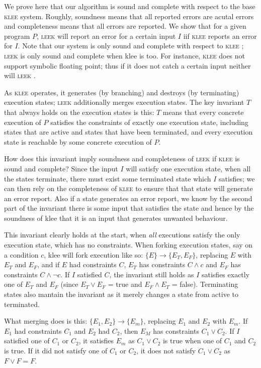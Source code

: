 \documentclass[12pt,a4paper]{article}
\newcommand{\klee}{\textsc{klee }}
\newcommand{\leek}{\textsc{leek }}
\begin{document}
We prove here that our algorithm is sound and complete with respect to the base \klee system. Roughly, soundness means that all reported errors are acutal errors and completeness means that all errors are reported. We show that for a given program $P$, \leek will report an error for a certain input $I$ iif \klee reports an error for $I$. Note that our system is only sound and complete with respect to \klee; \leek is only sound and complete when klee is too. For instance, \klee does not support symbolic floating point; thus if it does not catch a certain input neither will \leek.

As \klee operates, it generates (by branching) and destroys (by terminating) execution states; \leek additionally merges execution states. The key invariant $T$ that always holds on the execution states is this: $T$ means that every concrete execution of $P$ satisfies the constraints of exactly one execution state, including states that are active and states that have been terminated, and every execution state is reachable by some concrete execution of $P$.

How does this invariant imply soundness and completeness of \leek if \klee is sound and complete? Since the input $I$ will satisfy one execution state, when all the states terminate, there must exist some terminated state which $I$ satisfies; we can then rely on the completeness of \klee to ensure that that state will generate an error report. Also if a state generates an error report, we know by the second part of the invariant there is some input that satisfies the state and hence by the soundness of klee that it is an input that generates unwanted behaviour.

This invariant clearly holds at the start, when \emph{all} executions satisfy the only execution state, which has no constraints. When forking execution states, say on a condition $c$, klee will fork execution like so: $\{E\} \rightarrow \{E_T, E_F\}$, replacing $E$ with $E_T$ and $E_F$, and if $E$ had constraints $C$, $E_T$ has constraints $C \wedge c$ and $E_F$ has constraints $C \wedge \neg c$. If $I$ satisfied $C$, the invariant still holds as $I$ satisfies exactly one of $E_T$ and $E_F$ (since $E_T \vee E_F$ = true and $E_F \wedge E_T$ = false). Terminating states also mantain the invariant as it merely changes a state from active to terminated.

What merging does is this: $\{E_1, E_2\} \rightarrow \{E_m\}$, replacing $E_1$ and $E_2$ with $E_m$. If $E_1$ had constraints $C_1$ and $E_2$ had $C_2$, then $E_M$ has constraints $C_1 \vee C_2$. If $I$ satisfied one of $C_1$ or $C_2$, it satisfies $E_m$ as $C_1 \vee C_2$ is true when one of $C_1$ and $C_2$ is true. If it did not satisfy one of $C_1$ or $C_2$, it does not satisfy $C_1 \vee C_2$ as $F \vee F = F$.
\end{document}
